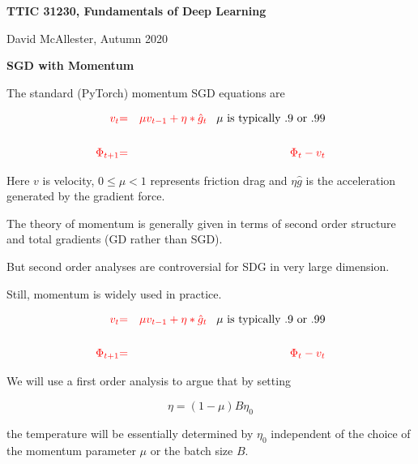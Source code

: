 


\newcommand{\solution}[1]{\bigskip {\bf Solution}: #1}



{\Huge
  \centerline{\bf TTIC 31230, Fundamentals of Deep Learning}
  \bigskip
  \centerline{David McAllester, Autumn 2020}
  \vfill
  \centerline{\bf SGD with Momentum}
  \vfill
  \vfill


The standard (PyTorch) momentum SGD equations are

\begin{eqnarray*}
  {\color{red} v_t} & {\color{red} =} & {\color{red} \mu v_{t-1} + \eta * \hat{g}_t} \;\;\;\mbox{$\mu$ is typically .9 or .99}\\
  \\
  {\color{red} \Phi_{t+1}} & {\color{red} =} & {\color{red} \Phi_t -  v_t} \\
\end{eqnarray*}

\vfill
Here $v$ is velocity, $0 \leq \mu < 1$ represents friction drag and $\eta \hat{g}$ is the acceleration generated by the gradient force.


The theory of momentum is generally given in terms of second order structure and total gradients (GD rather than SGD).

\vfill
But second order analyses are controversial for SDG in very large dimension.

\vfill
Still, momentum is widely used in practice.


\begin{eqnarray*}
  {\color{red} v_t} & {\color{red} =} & {\color{red} \mu v_{t-1} + \eta * \hat{g}_t} \;\;\;\mbox{$\mu$ is typically .9 or .99}\\
  \\
  {\color{red} \Phi_{t+1}} & {\color{red} =} & {\color{red} \Phi_t -  v_t} \\
\end{eqnarray*}

\vfill
We will use a first order analysis to argue that by setting

{\color{red} $$\eta = (1-\mu)B\eta_0$$}

\vfill
the temperature will be essentially determined by $\eta_0$ independent of the choice of the momentum parameter $\mu$ or the batch size $B$.

}

